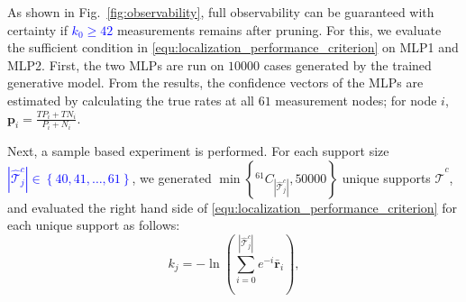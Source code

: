As shown in Fig.~\ref{fig:observability}, full observability can be guaranteed with certainty if \textcolor{blue}{$k_0\geq 42$} measurements remains after pruning. For this, we evaluate the sufficient condition in \eqref{equ:localization_performance_criterion} on MLP1 and MLP2. First, the two MLPs are run on $10000$ cases generated by the trained generative model. From the results, the confidence vectors of the MLPs are estimated by calculating the true rates at all $61$ measurement nodes; for node $i$, $\mathbf{p}_i=\frac{TP_i+TN_i}{P_i+N_i}$. 

Next, a sample based experiment is performed. For each support size \textcolor{blue}{$|\hat{\mathcal{T}}_j^c| \in \left\{40,41,\hdots,61\right\}$}, we generated  $\min\left\{^{61}C_{|\hat{\mathcal{T}}_j^c|},50000\right\}$ unique supports $\hat{\mathcal{T}}^c$, and  evaluated the right hand side of \eqref{equ:localization_performance_criterion} for each unique support as follows: 
$$k_j = -\ln\left(\sum_{i=0}^{|\hat{\mathcal{T}}_j^c|}e^{-i}\bar{\mathbf{r}}_i\right),$$
